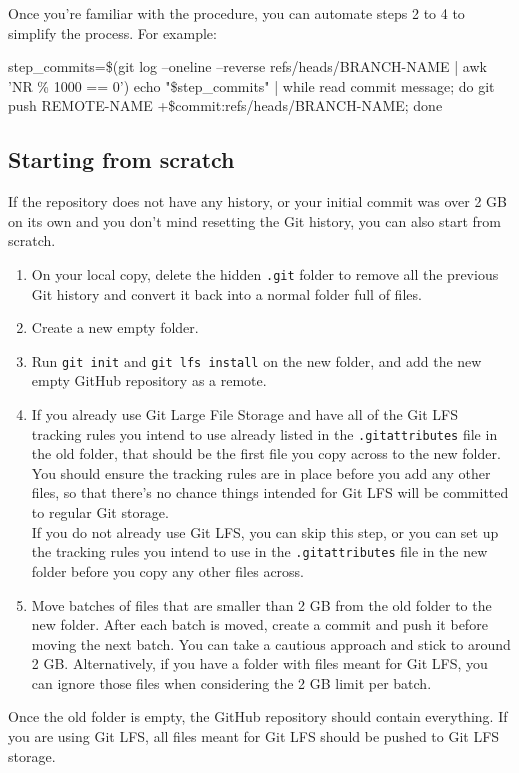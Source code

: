 Once you're familiar with the procedure, you can automate steps 2 to 4 to simplify the process. For example:
\begin{codeblock}[language=bash]
step_commits=\$(git log --oneline --reverse refs/heads/BRANCH-NAME | awk 'NR \% 1000 == 0')
echo "\$step\_commits" | while read commit message; do git push REMOTE-NAME +\$commit:refs/heads/BRANCH-NAME; done
\end{codeblock}

\subsection{Starting from scratch}
If the repository does not have any history, or your initial commit was over 2 GB on its own and you don't mind resetting the Git history, you can also start from scratch.
\begin{enumerate}
    \item On your local copy, delete the hidden \texttt{.git} folder to remove all the previous Git history and convert it back into a normal folder full of files.
    \item Create a new empty folder.
    \item Run \texttt{git init} and \texttt{git lfs install} on the new folder, and add the new empty GitHub repository as a remote.
    \item If you already use Git Large File Storage and have all of the Git LFS tracking rules you intend to use already listed in the \texttt{.gitattributes} file in the old folder, that should be the first file you copy across to the new folder. You should ensure the tracking rules are in place before you add any other files, so that there's no chance things intended for Git LFS will be committed to regular Git storage.
    \\ If you do not already use Git LFS, you can skip this step, or you can set up the tracking rules you intend to use in the \texttt{.gitattributes} file in the new folder before you copy any other files across. 
    \item Move batches of files that are smaller than 2 GB from the old folder to the new folder. After each batch is moved, create a commit and push it before moving the next batch. You can take a cautious approach and stick to around 2 GB. Alternatively, if you have a folder with files meant for Git LFS, you can ignore those files when considering the 2 GB limit per batch.
\end{enumerate}

Once the old folder is empty, the GitHub repository should contain everything. If you are using Git LFS, all files meant for Git LFS should be pushed to Git LFS storage.


